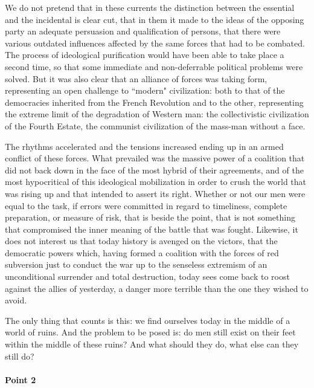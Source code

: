 We do not pretend that in these currents the distinction between the essential and the incidental is clear cut, that in them it made to the ideas of the opposing party an adequate persuasion and qualification of persons, that there were various outdated influences affected by the same forces that had to be combated. The process of ideological purification would have been able to take place a second time, so that some immediate and non-deferrable political problems were solved. But it was also clear that an alliance of forces was taking form, representing an open challenge to ``modern" civilization: both to that of the democracies inherited from the French Revolution and to the other, representing the extreme limit of the degradation of Western man: the collectivistic civilization of the Fourth Estate, the communist civilization of the mass-man without a face.

The rhythms accelerated and the tensions increased ending up in an armed conflict of these forces. What prevailed was the massive power of a coalition that did not back down in the face of the most hybrid of their agreements, and of the most hypocritical of this ideological mobilization in order to crush the world that was rising up and that intended to assert its right. Whether or not our men were equal to the task, if errors were committed in regard to timeliness, complete preparation, or measure of risk, that is beside the point, that is not something that compromised the inner meaning of the battle that was fought. Likewise, it does not interest us that today history is avenged on the victors, that the democratic powers which, having formed a coalition with the forces of red subversion just to conduct the war up to the senseless extremism of an unconditional surrender and total destruction, today sees come back to roost against the allies of yesterday, a danger more terrible than the one they wished to avoid.

The only thing that counts is this: we find ourselves today in the middle of a world of ruins. And the problem to be posed is: do men still exist on their feet within the middle of these ruins? And what should they do, what else can they still do?

\paragraph{Point 2}

